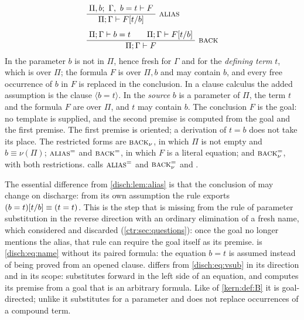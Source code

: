 \begin{definition}
\label{disch:def:alias}
\begin{align}
 &\infrule{\Pi,b;\ \Gamma,\ b=t\proves F}
          {\Pi;\Gamma\proves F\subst{t}{b}}\ \rulename{Alias}
 \label{disch:eq:alias}\\[1ex]
 &\infrule{\Pi;\Gamma\proves b=t\qquad\Pi;\Gamma\proves F\subst{t}{b}}
          {\Pi;\Gamma\proves F}\ \rulename{Back}
 \label{disch:eq:back}
\end{align}
In  the parameter $b$ is not in $\Pi$, hence fresh for
$\Gamma$ and for the \emph{defining term} $t$, which is over $\Pi$; the
formula $F$ is over $\Pi,b$ and may contain $b$, and every free occurrence
of $b$ in $F$ is replaced in the conclusion. In a clause calculus the added
assumption is the clause $\langle b=t\rangle$. In  the
\emph{source} $b$ is a parameter of $\Pi$, the term $t$ and the formula $F$
are over $\Pi$, and $t$ may contain $b$. The conclusion $F$ is the goal: no
template is supplied, and the second premise is computed from the goal and
the first premise. The first premise is oriented; a derivation of $t=b$
does not take its place. The restricted forms are
$\rulename{Back}_{\nu}$, in which $\Pi$ is not empty and $b\equiv\nu(\Pi)$;
$\rulename{Alias}^{=}$ and $\rulename{Back}^{=}$, in which $F$ is a literal
equation; and $\rulename{Back}^{=}_{\nu}$, with both restrictions.
 calls $\rulename{Alias}^{=}$ and
$\rulename{Back}^{=}_{\nu}$  and .
\end{definition}

The essential difference from \cref{disch:lem:alias} is that the
conclusion of  may change on discharge: from its own
assumption the rule exports $(b=t)[t/b]\equiv(t=t)$. This is the
step that is missing from the rule of parameter substitution in the reverse
direction with an ordinary elimination of a fresh name, which
 considered and discarded (\cref{ctr:sec:questions}):
once the goal no longer mentions the alias, that rule can require the goal
itself as its premise.  is 
\eqref{disch:eq:name} without its paired formula: the equation $b=t$ is
assumed instead of being proved from an opened clause. 
differs from  \eqref{disch:eq:vsub} in its direction and in
its scope:  substitutes forward in the left side of an
equation, and  computes its premise from a goal that is an
arbitrary formula. Like  of \cref{kern:def:B} it is
goal-directed; unlike  it substitutes for a parameter and
does not replace occurrences of a compound term.

